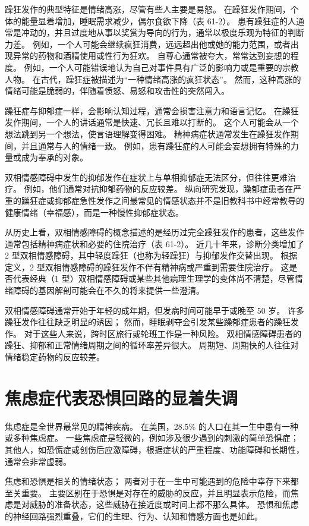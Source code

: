 躁狂发作的典型特征是情绪高涨，尽管有些人主要是易怒。 在躁狂发作期间，个体的能量显着增加，睡眠需求减少，偶尔食欲下降（表 61-2）。 患有躁狂症的人通常是冲动的，并且过度地从事以奖赏为导向的行为，通常以极度乐观为特征的判断力差。 例如，一个人可能会继续疯狂消费，远远超出他或她的能力范围，或者出现异常的药物和酒精使用或性行为狂欢。 自尊心通常被夸大，常常达到妄想的程度。 例如，一个人可能错误地认为自己对事件具有广泛的影响力或是重要的宗教人物。 在古代，躁狂症被描述为“一种情绪高涨的疯狂状态”。 然而，这种高涨的情绪可能是脆弱的，伴随着愤怒、易怒和攻击性的突然闯入。

躁狂症与抑郁症一样，会影响认知过程，通常会损害注意力和语言记忆。 在躁狂发作期间，一个人的讲话通常是快速、冗长且难以打断的。 这个人可能会从一个想法跳到另一个想法，使言语理解变得困难。 精神病症状通常发生在躁狂发作期间，并且通常与人的情绪一致。 例如，患有躁狂症的人可能会妄想拥有特殊的力量或成为奉承的对象。

双相情感障碍中发生的抑郁发作在症状上与单相抑郁症无法区分，但往往更难治疗。 例如，他们通常对抗抑郁药物的反应较差。 纵向研究发现，躁郁症患者在严重的躁狂症或抑郁症急性发作之间最常见的情感状态并不是旧教科书中经常教导的健康情绪（幸福感），而是一种慢性抑郁症状态。

从历史上看，双相情感障碍的概念描述的是经历过完全躁狂发作的患者，这些发作通常包括精神病症状和必要的住院治疗（表 61-2）。 近几十年来，诊断分类增加了 2 型双相情感障碍，其中轻度躁狂（也称为轻躁狂）与抑郁发作交替出现。 根据定义，2 型双相情感障碍的躁狂发作不伴有精神病或严重到需要住院治疗。 这是否代表经典（1 型）双相情感障碍或某些其他病理生理学的变体尚不清楚，尽管情绪障碍的基因解剖可能会在不久的将来提供一些澄清。

双相情感障碍通常开始于年轻的成年期，但发病时间可能早于或晚至 50 岁。 许多躁狂发作往往缺乏明显的诱因； 然而，睡眠剥夺会引发某些躁郁症患者的躁狂发作。 对于这些人来说，跨时区旅行或轮班工作是一种风险。 双相情感障碍患者的躁狂、抑郁和正常情绪周期之间的循环率差异很大。 周期短、周期快的人往往对情绪稳定药物的反应较差。

\section{焦虑症代表恐惧回路的显着失调}

焦虑症是全世界最常见的精神疾病。 在美国，28.5\% 的人口在其一生中患有一种或多种焦虑症。 一些焦虑症是轻微的，例如涉及很少遇到的刺激的简单恐惧症； 其他人，如恐慌症或创伤后应激障碍，根据症状的严重程度、功能障碍和长期性，通常会非常虚弱。

焦虑和恐惧是相关的情绪状态； 两者对于在一生中可能遇到的危险中幸存下来都至关重要。 主要区别在于恐惧是对存在的威胁的反应，并且明显表示危险，而焦虑是对威胁的准备状态，这些威胁在接近度或时间上都不那么具体。 恐惧和焦虑的神经回路强烈重叠，它们的生理、行为、认知和情感方面也是如此。

